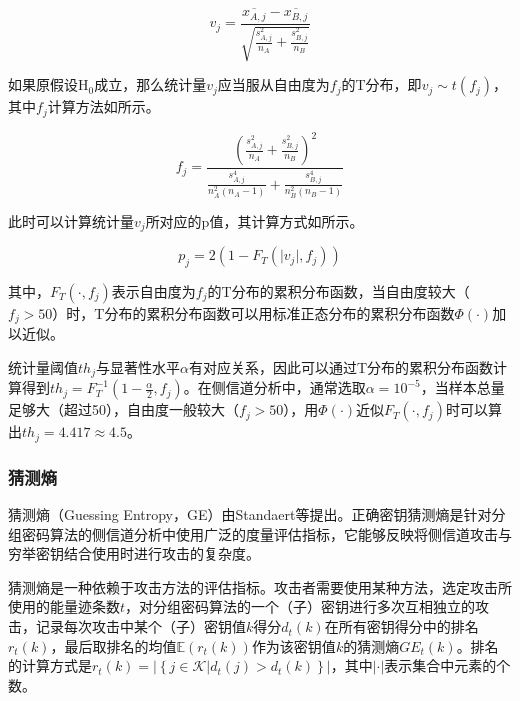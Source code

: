 {	\begin{equation}\label{eq:calct}
		v_j=\frac{\overline {x_{A,j}}-\overline{x_{B,j}}}{\sqrt{\frac{s_{A,j}^2}{n_A}+\frac{s_{B,j}^2}{n_B}}}
	\end{equation}
	
	如果原假设$\mathrm H_0$成立，那么统计量$v_j$应当服从自由度为$f_j$的T分布，即$v_j\sim t(f_j)$，其中$f_j$计算方法如所示。
	
	\begin{equation}\label{eq:calcdegoff}
		f_j=\frac{\left(\frac{s_{A,j}^2}{n_A} +\frac{s_{B,j}^2}{n_B}\right)^2 }{\frac{s_{A,j}^4}{n_A^2(n_A-1)}+\frac{s_{B,j}^4}{n_B^2(n_B-1)}}
	\end{equation}
	
	此时可以计算统计量$v_j$所对应的p值，其计算方式如所示。
	
	\begin{equation}\label{eq:calcp}
		p_j=2\left( 1-F_T(\vert v_j\vert ,f_j)\right) 
	\end{equation}
	
	\noindent 其中，$F_T(\cdot,f_j)$表示自由度为$f_j$的T分布的累积分布函数，当自由度较大（$f_j>50$）时，T分布的累积分布函数可以用标准正态分布的累积分布函数$\Phi(\cdot)$加以近似。
	
	统计量阈值$th_j$与显著性水平$\alpha$有对应关系，因此可以通过T分布的累积分布函数计算得到$th_j=F_T^{-1}\left( 1-\frac\alpha2,f_j\right) $。在侧信道分析中，通常选取$\alpha=10^{-5}$，当样本总量足够大（超过50），自由度一般较大（$f_j>50$），用$\Phi(\cdot)$近似$F_T(\cdot,f_j)$时可以算出$th_j=4.417\approx4.5$。
	
	\subsubsection{猜测熵}
	猜测熵（Guessing Entropy，GE）由Standaert等\citep{Standaert09}提出。正确密钥猜测熵是针对分组密码算法的侧信道分析中使用广泛的度量评估指标，它能够反映将侧信道攻击与穷举密钥结合使用时进行攻击的复杂度。
	
	猜测熵是一种依赖于攻击方法的评估指标。攻击者需要使用某种方法，选定攻击所使用的能量迹条数$t$，对分组密码算法的一个（子）密钥进行多次互相独立的攻击，记录每次攻击中某个（子）密钥值$k$得分$d_t(k)$在所有密钥得分中的排名$r_t(k)$，最后取排名的均值$\mathbb E\left(r_t(k) \right) $作为该密钥值$k$的猜测熵$GE_{t}(k)$。排名的计算方式是$r_t(k)=\left\vert\left\lbrace j\in\mathcal K|d_t(j)>d_t(k)\right\rbrace  \right\vert $，其中$\vert\cdot\vert$表示集合中元素的个数。
	
}
